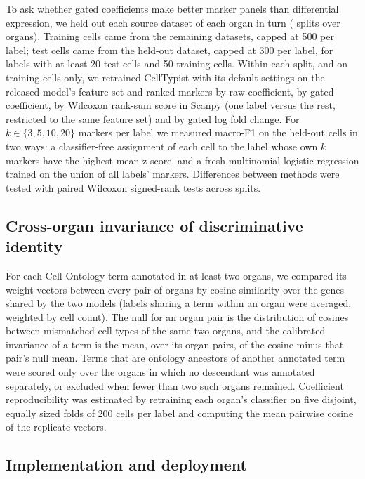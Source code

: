 \documentclass[11pt]{article}
\begin{document}
To ask whether gated coefficients make better marker panels than differential expression, we held out each source dataset of each organ in turn (\pnSplits{} splits over \pnOrgans{} organs). Training cells came from the remaining datasets, capped at 500 per label; test cells came from the held-out dataset, capped at 300 per label, for labels with at least 20 test cells and 50 training cells. Within each split, and on training cells only, we retrained CellTypist with its default settings on the released model's feature set and ranked markers by raw coefficient, by gated coefficient, by Wilcoxon rank-sum score in Scanpy \cite{wolf2018} (one label versus the rest, restricted to the same feature set) and by gated log fold change. For $k \in \{3, 5, 10, 20\}$ markers per label we measured macro-F1 on the held-out cells in two ways: a classifier-free assignment of each cell to the label whose own $k$ markers have the highest mean z-score, and a fresh multinomial logistic regression \cite{pedregosa2011} trained on the union of all labels' markers. Differences between methods were tested with paired Wilcoxon signed-rank tests across splits.

\subsection{Cross-organ invariance of discriminative identity}

For each Cell Ontology term annotated in at least two organs, we compared its weight vectors between every pair of organs by cosine similarity over the genes shared by the two models (labels sharing a term within an organ were averaged, weighted by cell count). The null for an organ pair is the distribution of cosines between mismatched cell types of the same two organs, and the calibrated invariance of a term is the mean, over its organ pairs, of the cosine minus that pair's null mean. Terms that are ontology ancestors of another annotated term were scored only over the organs in which no descendant was annotated separately, or excluded when fewer than two such organs remained. Coefficient reproducibility was estimated by retraining each organ's classifier on five disjoint, equally sized folds of 200 cells per label and computing the mean pairwise cosine of the replicate vectors.

\subsection{Implementation and deployment}
\end{document}

